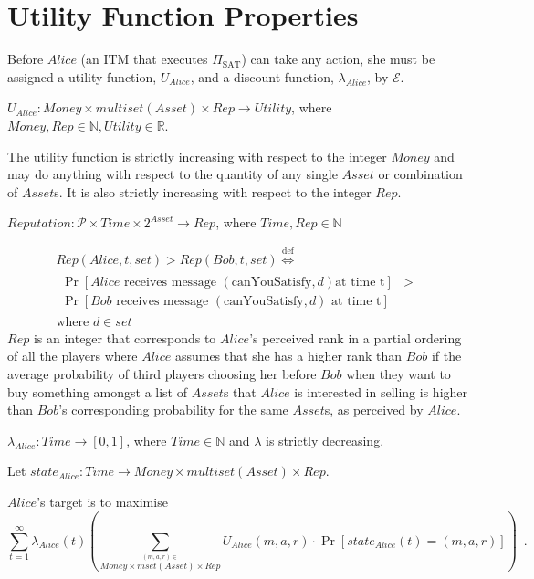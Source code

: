 \section{Utility Function Properties}
  Before $Alice$ (an ITM that executes $\Pi_{\mathrm{SAT}}$) can take any action, she must
  be assigned a utility function, $U_{Alice}$, and a discount function, $\lambda_{Alice}$,
  by $\mathcal{E}$.
  \begin{definition}
    $U_{Alice} : Money \times multiset\left(Asset\right) \times Rep \rightarrow
    Utility$, where $Money, Rep \in \mathbb{N}, Utility \in \mathbb{R}$.
  \end{definition}
  The utility function is strictly increasing with respect to the integer $Money$ and may
  do anything with respect to the quantity of any single $Asset$ or combination of
  $Asset$s. It is also strictly increasing with respect to the integer $Rep$.

  \begin{definition}
    $Reputation : \mathcal{P} \times Time \times 2^{Asset} \rightarrow Rep$, where $Time,
    Rep \in \mathbb{N}$
  \end{definition}
  \begin{gather*}
    Rep\left(Alice, t, set\right) > Rep\left(Bob, t, set\right)
    \overset{\mathrm{def}}{\iff} \\
    \begin{aligned}
      \Pr\left[Alice \mbox{ receives message } \left(\mbox{canYouSatisfy}, d\right) \mbox{
      at time t}\right] &> \\
      \Pr\left[Bob \mbox{ receives message } \left(\mbox{canYouSatisfy}, d\right) \mbox{ at
      time t}\right] &
    \end{aligned} \\
    \mbox{where } d \in set
  \end{gather*}
  $Rep$ is an integer that corresponds to $Alice$'s perceived rank in a partial ordering
  of all the players where $Alice$ assumes that she has a higher rank than $Bob$ if the
  average probability of third players choosing her before $Bob$ when they want to buy
  something amongst a list of $Asset$s that $Alice$ is interested in selling is higher
  than $Bob$'s corresponding probability for the same $Asset$s, as perceived by $Alice$.

  \begin{definition}
    $\lambda_{Alice} : Time \rightarrow \left[0, 1\right]$, where $Time \in \mathbb{N}$
    and $\lambda$ is strictly decreasing.
  \end{definition}
  \begin{definition}[State]
  Let $state_{Alice} : Time \rightarrow Money \times multiset\left(Asset\right) \times
  Rep$.
  \end{definition}
  $Alice$'s target is to maximise
  \begin{equation*}
    \sum\limits_{t = 1}^{\infty}
    \lambda_{Alice}\left(t\right)\left(\sum\limits_{\overset{\left(m, a, r\right)
    \in}{Money \times mset\left(Asset\right) \times Rep}} U_{Alice}\left(m, a,
    r\right) \cdot \Pr\left[state_{Alice}\left(t\right) = \left(m, a,
    r\right)\right]\right) \enspace.
  \end{equation*}
